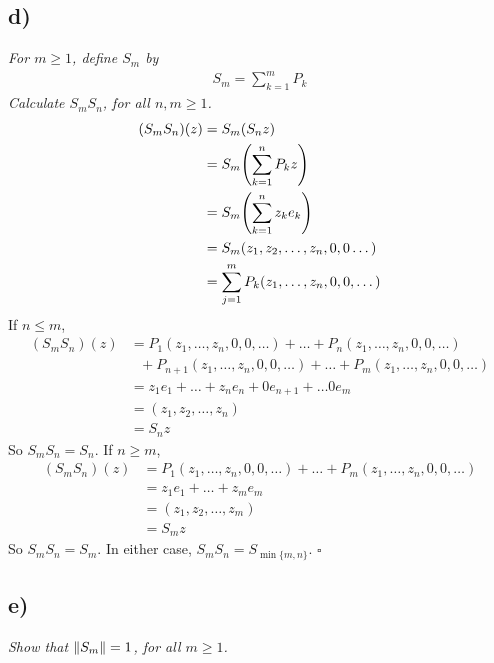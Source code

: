 \documentclass[12pt]{article}
\theoremstyle{plain}
\begin{document}
\subsection*{ d)}
\emph{For $m \geq 1$, define $S_m$ by}
\begin{align*}
    S_m = \sum_{k=1}^m P_k
\end{align*}
\emph{Calculate $S_m S_n$, for all $n,m \geq 1$.} \\

\begin{align*}
    (S_mS_n)(z) &= S_m(S_nz) \\
    &= S_m\qty(\sum_{k=1}^nP_kz) \\
    &= S_m\qty(\sum_{k=1}^nz_ke_k) \\
    &= S_m\qty(z_1,z_2, \dots, z_n, 0, 0\dots) \\
    &= \sum_{j=1}^m P_k(z_1, \dots, z_n, 0, 0, \dots)
\end{align*}
If $n \leq m$,
\begin{align*}
    (S_mS_n)(z) &= P_1(z_1, \dots, z_n, 0, 0, \dots) + \dots + P_n(z_1, \dots, z_n, 0, 0, \dots) \\
    &\ \ \ + P_{n+1}(z_1, \dots, z_n, 0, 0, \dots) + \dots + P_m(z_1, \dots, z_n, 0, 0, \dots) \\
    &= z_1e_1 + \dots + z_ne_n + 0e_{n+1} + \dots 0e_m \\
    &= (z_1, z_2, \dots, z_n) \\
    &= S_nz
\end{align*}
So $S_mS_n = S_n$.  If $n \geq m$,
\begin{align*}
    (S_mS_n)(z) &= P_1(z_1, \dots, z_n, 0, 0, \dots) + \dots + P_m(z_1, \dots, z_n, 0, 0, \dots) \\
    &= z_1e_1 + \dots + z_me_m \\
    &= (z_1, z_2, \dots, z_m) \\
    &= S_mz
\end{align*}
So $S_mS_n = S_m$.  In either case, $S_mS_n = S_{\min\{m,n\}}$. \hfill $\square$

\subsection*{ e)}
\emph{Show that $\norm{S_m} = 1$, for all $m \geq 1$.} \\
\end{document}
